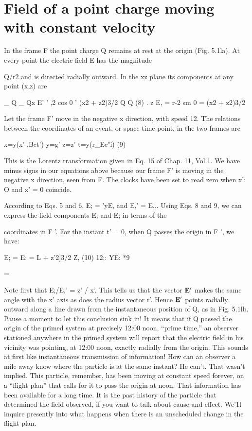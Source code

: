 \section{Field of a point charge moving with constant velocity}
In the frame F the point charge Q remains at rest at the origin
(Fig. 5.1la). At every point the electric field E has the magnitude

 

Q/r2 and is directed radially outward. In the xz plane its components
at any point (x,z) are

\begin{equation}
\end{equation}
_ Q _ Qx
E' ' ,2 cos 0 ' (x2 + z2)3/2
Q Q (8)
. z
E, = r-2 sm 0 = (x2 + z2)3/2

Let the frame F' move in the negative x direction, with speed 12. The
relations between the coordinates of an event, or space-time point,
in the two frames are

\begin{equation}
\end{equation}
x=y(x'-,Bct') y=g' z=z' t=y(r_Ec"i) (9)

This is the Lorentz transformation given in Eq. 15 of Chap. 11, Vol.1.
We have minus signs in our equations above because our frame F' is
moving in the negative x direction, seen from F. The clocks have
been set to read zero when x': O and x' = 0 coincide.

According to Eqs. 5 and 6, E; = 'yE, and E,' = E,,. Using Eqs. 8
and 9, we can express the field components E; and E; in terms of the

coordinates in F '. For the instant t' = 0, when Q passes the origin
in F ', we have:

\begin{equation}
\end{equation}
E; = E: = L
 + z'2]3/2
Z, (10)
12;: YE: *9

= 

Note first that E;/E,' = z' / x'. This tells us that the vector $\mathbf{E}'$ makes
the same angle with the x' axis as does the radius vector r'. Hence
$\mathbf{E}'$ points radially outward along a line drawn from the instantaneous
position of Q, as in Fig. 5.1lb. Pause a moment to let this conclusion
sink in! It means that if Q passed the origin of the primed system at
precisely 12:00 noon, ``prime time,'' an observer stationed anywhere
in the primed system will report that the electric field in his vicinity
was pointing, at 12:00 noon, exactly radially from the origin. This
sounds at first like instantaneous transmission of information! How
can an observer a mile away know where the particle is at the same
instant? He can't. That wasn't implied. This particle, remember,
has been moving at constant speed forever, on a ``ffight plan'' that
calls for it to pass the origin at noon. That information has been
available for a long time. It is the past history of the particle that
determined the field observed, if you want to talk about cause and
effect. We'1l inquire presently into what happens when there is an
unscheduled change in the ffight plan.

